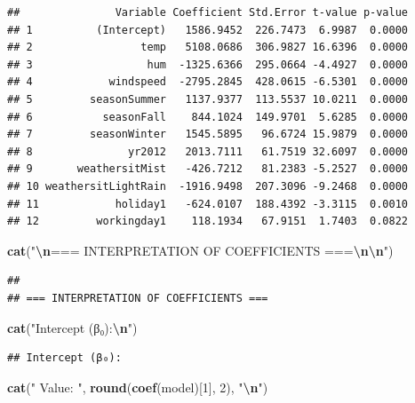 \documentclass[
]{article}
\newenvironment{Shaded}{\begin{snugshade}}{\end{snugshade}}
\newcommand{\DecValTok}[1]{\textcolor[rgb]{0.00,0.00,0.81}{#1}}
\newcommand{\FunctionTok}[1]{\textcolor[rgb]{0.13,0.29,0.53}{\textbf{#1}}}
\newcommand{\NormalTok}[1]{#1}
\newcommand{\SpecialCharTok}[1]{\textcolor[rgb]{0.81,0.36,0.00}{\textbf{#1}}}
\newcommand{\StringTok}[1]{\textcolor[rgb]{0.31,0.60,0.02}{#1}}
\begin{document}
\begin{verbatim}
##               Variable Coefficient Std.Error t-value p-value
## 1          (Intercept)   1586.9452  226.7473  6.9987  0.0000
## 2                 temp   5108.0686  306.9827 16.6396  0.0000
## 3                  hum  -1325.6366  295.0664 -4.4927  0.0000
## 4            windspeed  -2795.2845  428.0615 -6.5301  0.0000
## 5         seasonSummer   1137.9377  113.5537 10.0211  0.0000
## 6           seasonFall    844.1024  149.9701  5.6285  0.0000
## 7         seasonWinter   1545.5895   96.6724 15.9879  0.0000
## 8               yr2012   2013.7111   61.7519 32.6097  0.0000
## 9       weathersitMist   -426.7212   81.2383 -5.2527  0.0000
## 10 weathersitLightRain  -1916.9498  207.3096 -9.2468  0.0000
## 11            holiday1   -624.0107  188.4392 -3.3115  0.0010
## 12         workingday1    118.1934   67.9151  1.7403  0.0822
\end{verbatim}

\begin{Shaded}
\begin{Highlighting}[]
\FunctionTok{cat}\NormalTok{(}\StringTok{"}\SpecialCharTok{\textbackslash{}n}\StringTok{=== INTERPRETATION OF COEFFICIENTS ===}\SpecialCharTok{\textbackslash{}n\textbackslash{}n}\StringTok{"}\NormalTok{)}
\end{Highlighting}
\end{Shaded}

\begin{verbatim}
## 
## === INTERPRETATION OF COEFFICIENTS ===
\end{verbatim}

\begin{Shaded}
\begin{Highlighting}[]
\FunctionTok{cat}\NormalTok{(}\StringTok{"Intercept (β₀):}\SpecialCharTok{\textbackslash{}n}\StringTok{"}\NormalTok{)}
\end{Highlighting}
\end{Shaded}

\begin{verbatim}
## Intercept (β₀):
\end{verbatim}

\begin{Shaded}
\begin{Highlighting}[]
\FunctionTok{cat}\NormalTok{(}\StringTok{"  Value: "}\NormalTok{, }\FunctionTok{round}\NormalTok{(}\FunctionTok{coef}\NormalTok{(model)[}\DecValTok{1}\NormalTok{], }\DecValTok{2}\NormalTok{), }\StringTok{"}\SpecialCharTok{\textbackslash{}n}\StringTok{"}\NormalTok{)}
\end{Highlighting}
\end{Shaded}
\end{document}
